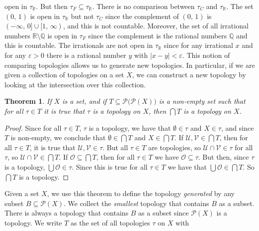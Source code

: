 \documentclass{article}
\theoremstyle{plain}
\newtheorem{theorem}{Theorem}[section]
\theoremstyle{normal}
\begin{document}
    open in $\tau_{\mathbb{R}}$. But then
    $\tau_{F}\subseteq\tau_{\mathbb{R}}$. There is no comparison between
    $\tau_{C}$ and $\tau_{\mathbb{R}}$. The set
    $(0,\,1)$ is open in $\tau_{\mathbb{R}}$ but not $\tau_{C}$ since the
    complement of $(0,\,1)$ is $(-\infty,\,0]\cup[1,\,\infty)$, and this is
    not countable. Moreover, the set of all irrational numbers
    $\mathbb{R}\setminus\mathbb{Q}$ is open in $\tau_{F}$ since the
    complement is the rational numbers $\mathbb{Q}$ and this is countable.
    The irrationals are not open in $\tau_{\mathbb{R}}$ since for any
    irrational $x$ and for any $\varepsilon>0$ there is a rational number
    $y$ with $|x-y|<\varepsilon$. This notion of comparing topologies allows
    us to generate new topologies. In particular, if we are given a collection
    of topologies on a set $X$, we can construct a new topology by looking at
    the intersection over this collection.
    \begin{theorem}
        If $X$ is a set, and if $T\subseteq\mathcal{P}\big(\mathcal{P}(X)\big)$
        is a non-empty set such that for all $\tau\in{T}$ it is true that
        $\tau$ is a topology on $X$, then $\bigcap{T}$ is a topology on $X$.
    \end{theorem}
    \begin{proof}
        Since for all $\tau\in{T}$, $\tau$ is a topology, we have that
        $\emptyset\in\tau$ and $X\in\tau$, and since $T$ is non-empty, we
        conclude that $\emptyset\in\bigcap{T}$ and $X\in\bigcap{T}$. If
        $\mathcal{U},\mathcal{V}\in\bigcap{T}$, then for all $\tau\in{T}$, it is
        true that $\mathcal{U},\mathcal{V}\in\tau$. But all $\tau\in{T}$ are
        topologies, so $\mathcal{U}\cap\mathcal{V}\in\tau$ for all $\tau$, so
        $\mathcal{U}\cap\mathcal{V}\in\bigcap{T}$. If
        $\mathcal{O}\subseteq\bigcap{T}$, then for all $\tau\in{T}$ we have
        $\mathcal{O}\subseteq\tau$. But then, since $\tau$ is a topology,
        $\bigcup\mathcal{O}\in\tau$. Since this is true for all $\tau\in{T}$ we
        have that $\bigcup\mathcal{O}\in\bigcap{T}$.
        So $\bigcap{T}$ is a topology.
    \end{proof}
    Given a set $X$, we use this theorem to define the topology
    \textit{generated} by any subset $B\subseteq\mathcal{P}(X)$. We collect the
    \textit{smallest} topology that contains $B$ as a subset. There is always
    a topology that contains $B$ as a subset since $\mathcal{P}(X)$ is a
    topology. We write $T$ as the set of all topologies $\tau$ on $X$ with
\end{document}
